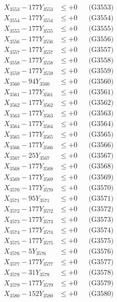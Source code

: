 \documentclass[a4paper,10pt]{article}
\begin{document}
{\begin{align}
X_{3553} - 177Y_{3553} &\leq +0 && \text{(G3553)} \\
X_{3554} - 177Y_{3554} &\leq +0 && \text{(G3554)} \\
X_{3555} - 177Y_{3555} &\leq +0 && \text{(G3555)} \\
X_{3556} - 177Y_{3556} &\leq +0 && \text{(G3556)} \\
X_{3557} - 177Y_{3557} &\leq +0 && \text{(G3557)} \\
X_{3558} - 177Y_{3558} &\leq +0 && \text{(G3558)} \\
X_{3559} - 177Y_{3559} &\leq +0 && \text{(G3559)} \\
X_{3560} - 94Y_{3560} &\leq +0 && \text{(G3560)} \\
\allowbreak
X_{3561} - 177Y_{3561} &\leq +0 && \text{(G3561)} \\
X_{3562} - 177Y_{3562} &\leq +0 && \text{(G3562)} \\
X_{3563} - 177Y_{3563} &\leq +0 && \text{(G3563)} \\
X_{3564} - 177Y_{3564} &\leq +0 && \text{(G3564)} \\
X_{3565} - 177Y_{3565} &\leq +0 && \text{(G3565)} \\
X_{3566} - 177Y_{3566} &\leq +0 && \text{(G3566)} \\
X_{3567} - 25Y_{3567} &\leq +0 && \text{(G3567)} \\
X_{3568} - 177Y_{3568} &\leq +0 && \text{(G3568)} \\
X_{3569} - 177Y_{3569} &\leq +0 && \text{(G3569)} \\
X_{3570} - 177Y_{3570} &\leq +0 && \text{(G3570)} \\
\allowbreak
X_{3571} - 95Y_{3571} &\leq +0 && \text{(G3571)} \\
X_{3572} - 177Y_{3572} &\leq +0 && \text{(G3572)} \\
X_{3573} - 177Y_{3573} &\leq +0 && \text{(G3573)} \\
X_{3574} - 177Y_{3574} &\leq +0 && \text{(G3574)} \\
X_{3575} - 177Y_{3575} &\leq +0 && \text{(G3575)} \\
X_{3576} - 5Y_{3576} &\leq +0 && \text{(G3576)} \\
X_{3577} - 177Y_{3577} &\leq +0 && \text{(G3577)} \\
X_{3578} - 31Y_{3578} &\leq +0 && \text{(G3578)} \\
X_{3579} - 177Y_{3579} &\leq +0 && \text{(G3579)} \\
X_{3580} - 152Y_{3580} &\leq +0 && \text{(G3580)} \\

\end{align}}
\end{document}
